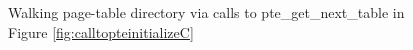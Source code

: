 \begin{figure}
\fi
\caption{Walking page-table directory via calls to \textsf{pte\_get\_next\_table} in Figure \ref{fig:calltopteinitializeC}}
\label{walkpgdirC}
\vspace{-1em}
\end{figure}

